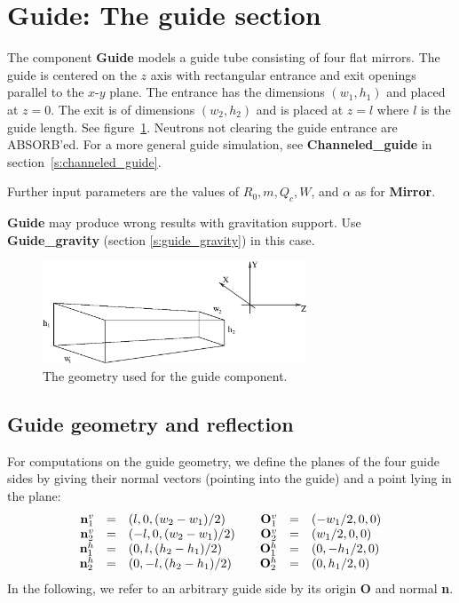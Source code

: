 \section{Guide: The guide section}


The component {\bf Guide}
models a guide tube consisting of four flat mirrors. The
guide is centered on the $z$ axis with rectangular entrance and exit
openings parallel to the $x$-$y$ plane. The entrance has the dimensions
$(w_1,h_1)$ and placed at $z=0$. The exit is of dimensions $(w_2,h_2)$
and is placed at $z=l$ where $l$ is the guide length. See
figure~\ref{f:guide}. Neutrons not clearing the guide entrance are
ABSORB'ed. For a more general guide simulation, see {\bf Channeled\_guide}
in section~\ref{s:channeled_guide}.

Further input parameters are the values of $R_0, m, Q_c, W$, and $\alpha$ 
as for {\bf Mirror}.

{\bf Guide} may produce wrong results with gravitation support. 
Use {\bf Guide\_gravity} (section \ref{s:guide_gravity}) in this case.

\begin{figure}
  \begin{center}
    \includegraphics[width=0.7\textwidth]{figures/guide1.eps}
  \end{center}
\caption{The geometry used for the guide component.}
\label{f:guide}
\end{figure}

\subsection{Guide geometry and reflection}
For computations on the guide geometry, we define the planes of the four
guide sides by giving their normal vectors (pointing into the guide)
and a point lying in the plane:
$$
\begin{array}{rclcrcl}
{\bf n}^v_1 &=& (l, 0, {(w_2 - w_1) / 2})
     & & {\bf O}^v_1 &=& (- w_1 / 2, 0, 0) \\
{\bf n}^v_2 &=& (-l, 0, {(w_2 - w_1) / 2})
     & & {\bf O}^v_2 &=& (w_1 / 2, 0, 0) \\
{\bf n}^h_1 &=& (0, l, {(h_2 - h_1) / 2})
     & & {\bf O}^h_1 &=& (0, - h_1 / 2, 0) \\
{\bf n}^h_2 &=& (0, -l, {(h_2 - h_1) / 2})
     & & {\bf O}^h_2 &=& (0, h_1 / 2, 0) \\
\end{array}
$$
In the following, we refer to an arbitrary guide side by its origin
{\bf O} and normal {\bf n}.


